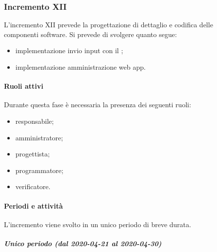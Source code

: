 
		\subsubsection{Incremento XII}
			
			L'incremento XII prevede la progettazione di dettaglio e codifica delle componenti software. Si prevede di svolgere quanto segue:
			\begin{itemize}
				\item implementazione invio input con il ;
				\item implementazione amministrazione web app.
			\end{itemize}
			
			\paragraph{Ruoli attivi}
			
				Durante questa fase è necessaria la presenza dei seguenti ruoli:
				\begin{itemize}
					\item responsabile;
					\item amministratore;
					\item progettista;
					\item programmatore;
					\item verificatore.
				\end{itemize}
			
			\paragraph{Periodi e attività}
			
				L'incremento viene svolto in un unico periodo di breve durata.
				
				\subparagraph{Unico periodo (dal 2020-04-21 al 2020-04-30)}
				
